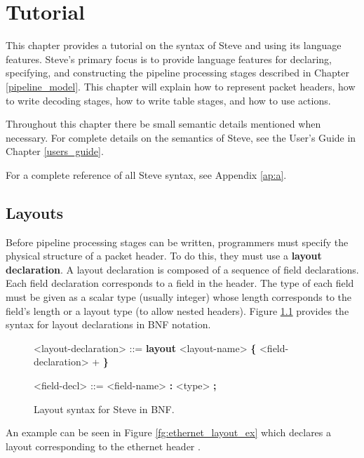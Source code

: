 \chapter{Tutorial} \label{tutorial}

This chapter provides a tutorial on the syntax of Steve and using its language features. Steve's primary focus is to provide language features for declaring, specifying, and constructing the pipeline processing stages described in Chapter \ref{pipeline_model}. This chapter will explain how to represent packet headers, how to write decoding stages, how to write table stages, and how to use actions.

Throughout this chapter there be small semantic details mentioned when necessary. For complete details on the semantics of Steve, see the User's Guide in Chapter \ref{users_guide}.

For a complete reference of all Steve syntax, see Appendix \ref{ap:a}.

\section{Layouts} \label{layout_tut}

Before pipeline processing stages can be written, programmers must specify the physical structure of a packet header. To do this, they must use a \textbf{layout declaration}. A layout declaration is composed of a sequence of field declarations. Each field declaration corresponds to a field in the header. The type of each field must be given as a scalar type (usually integer) whose length corresponds to the field's length or a layout type (to allow nested headers). Figure \ref{fg:layout_syntax} provides the syntax for layout declarations in BNF notation.

\begin{figure}
\begin{mdframed}
\begin{grammar}

<layout-declaration> ::=
\textbf{layout} <layout-name> 
\textbf{\{}
	<field-declaration> +
\textbf{\}}

<field-decl> ::=
<field-name> \textbf{:} <type> \textbf{;}

\end{grammar}
\end{mdframed}
\caption{Layout syntax for Steve in BNF.}
\label{fg:layout_syntax}
\end{figure}


An example can be seen in Figure \ref{fg:ethernet_layout_ex} which declares a layout corresponding to the ethernet header \cite{eth_std}. 

